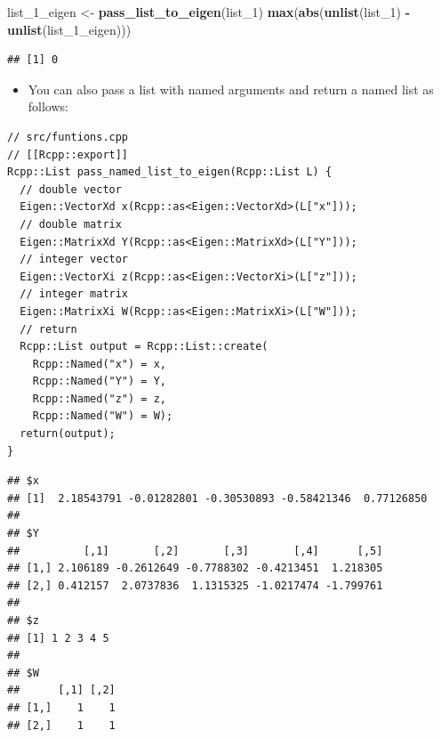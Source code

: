 \documentclass[]{book}
\newenvironment{Shaded}{\begin{snugshade}}{\end{snugshade}}
\newcommand{\KeywordTok}[1]{\textcolor[rgb]{0.13,0.29,0.53}{\textbf{#1}}}
\newcommand{\DecValTok}[1]{\textcolor[rgb]{0.00,0.00,0.81}{#1}}
\newcommand{\StringTok}[1]{\textcolor[rgb]{0.31,0.60,0.02}{#1}}
\newcommand{\CommentTok}[1]{\textcolor[rgb]{0.56,0.35,0.01}{\textit{#1}}}
\newcommand{\OperatorTok}[1]{\textcolor[rgb]{0.81,0.36,0.00}{\textbf{#1}}}
\newcommand{\NormalTok}[1]{#1}
\providecommand{\tightlist}{%
  \setlength{\itemsep}{0pt}\setlength{\parskip}{0pt}}
\begin{document}
\begin{Shaded}
\begin{Highlighting}[]
\NormalTok{list_1_eigen <-}\StringTok{ }\KeywordTok{pass_list_to_eigen}\NormalTok{(list_}\DecValTok{1}\NormalTok{)}
\KeywordTok{max}\NormalTok{(}\KeywordTok{abs}\NormalTok{(}\KeywordTok{unlist}\NormalTok{(list_}\DecValTok{1}\NormalTok{) }\OperatorTok{-}\StringTok{ }\KeywordTok{unlist}\NormalTok{(list_1_eigen)))}
\end{Highlighting}
\end{Shaded}

\begin{verbatim}
## [1] 0
\end{verbatim}

\begin{itemize}
\tightlist
\item
  You can also pass a list with named arguments and return a named list
  as follows:
\end{itemize}

\begin{verbatim}
// src/funtions.cpp
// [[Rcpp::export]]
Rcpp::List pass_named_list_to_eigen(Rcpp::List L) {
  // double vector
  Eigen::VectorXd x(Rcpp::as<Eigen::VectorXd>(L["x"]));
  // double matrix
  Eigen::MatrixXd Y(Rcpp::as<Eigen::MatrixXd>(L["Y"]));
  // integer vector
  Eigen::VectorXi z(Rcpp::as<Eigen::VectorXi>(L["z"]));
  // integer matrix
  Eigen::MatrixXi W(Rcpp::as<Eigen::MatrixXi>(L["W"]));
  // return
  Rcpp::List output = Rcpp::List::create(
    Rcpp::Named("x") = x, 
    Rcpp::Named("Y") = Y, 
    Rcpp::Named("z") = z, 
    Rcpp::Named("W") = W);
  return(output);
}
\end{verbatim}

\begin{Shaded}
\end{Shaded}

\begin{verbatim}
## $x
## [1]  2.18543791 -0.01282801 -0.30530893 -0.58421346  0.77126850
## 
## $Y
##          [,1]       [,2]       [,3]       [,4]      [,5]
## [1,] 2.106189 -0.2612649 -0.7788302 -0.4213451  1.218305
## [2,] 0.412157  2.0737836  1.1315325 -1.0217474 -1.799761
## 
## $z
## [1] 1 2 3 4 5
## 
## $W
##      [,1] [,2]
## [1,]    1    1
## [2,]    1    1
\end{verbatim}
\end{document}
